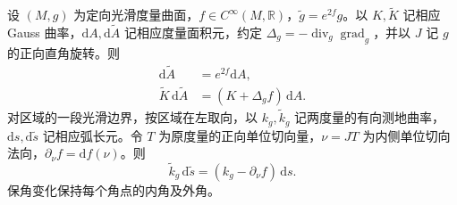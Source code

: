 \begin{proposition}
	\label{g1:prop:conformal-gauss-bonnet-change}
	设 \((M,g)\) 为定向光滑度量曲面，\(f\in C^\infty(M,\mathbb R)\)，\(\widetilde g=e^{2f}g\)。以 \(K,\widetilde K\) 记相应 Gauss 曲率，\(\mathrm dA,\mathrm d\widetilde A\) 记相应度量面积元，约定 \(\Delta_g=-\operatorname{div}_g\operatorname{grad}_g\)，并以 \(J\) 记 \(g\) 的正向直角旋转。则
	\begin{align}
		\mathrm{d}\widetilde A&=e^{2f}\mathrm{d}A,\label{g1:eq:conformal-area-change}\\
		\widetilde K\,\mathrm{d}\widetilde A&=(K+\Delta_g f)\,\mathrm{d}A.\label{g1:eq:conformal-curvature-change}
	\end{align}
	对区域的一段光滑边界，按区域在左取向，以 \(k_g,\widetilde k_g\) 记两度量的有向测地曲率，\(\mathrm ds,\mathrm d\widetilde s\) 记相应弧长元。令 \(T\) 为原度量的正向单位切向量，\(\nu=JT\) 为内侧单位切向法向，\(\partial_\nu f=\mathrm{d}f(\nu)\)。则
	\begin{equation}
		\label{g1:eq:conformal-boundary-change}
		\widetilde k_g\,\mathrm{d}\widetilde s=(k_g-\partial_\nu f)\,\mathrm{d}s.
	\end{equation}
	保角变化保持每个角点的内角及外角。
\end{proposition}
